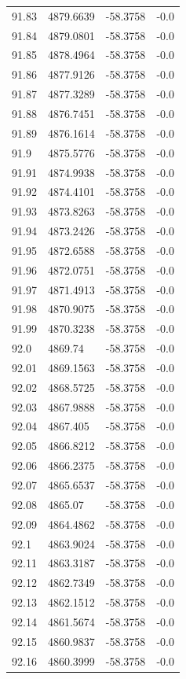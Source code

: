 \begin{table}[H]
\begin{tabular}{llll}
91.83 & 4879.6639 & -58.3758 & -0.0 \\
91.84 & 4879.0801 & -58.3758 & -0.0 \\
91.85 & 4878.4964 & -58.3758 & -0.0 \\
91.86 & 4877.9126 & -58.3758 & -0.0 \\
91.87 & 4877.3289 & -58.3758 & -0.0 \\
91.88 & 4876.7451 & -58.3758 & -0.0 \\
91.89 & 4876.1614 & -58.3758 & -0.0 \\
91.9 & 4875.5776 & -58.3758 & -0.0 \\
91.91 & 4874.9938 & -58.3758 & -0.0 \\
91.92 & 4874.4101 & -58.3758 & -0.0 \\
91.93 & 4873.8263 & -58.3758 & -0.0 \\
91.94 & 4873.2426 & -58.3758 & -0.0 \\
91.95 & 4872.6588 & -58.3758 & -0.0 \\
91.96 & 4872.0751 & -58.3758 & -0.0 \\
91.97 & 4871.4913 & -58.3758 & -0.0 \\
91.98 & 4870.9075 & -58.3758 & -0.0 \\
91.99 & 4870.3238 & -58.3758 & -0.0 \\
92.0 & 4869.74 & -58.3758 & -0.0 \\
92.01 & 4869.1563 & -58.3758 & -0.0 \\
92.02 & 4868.5725 & -58.3758 & -0.0 \\
92.03 & 4867.9888 & -58.3758 & -0.0 \\
92.04 & 4867.405 & -58.3758 & -0.0 \\
92.05 & 4866.8212 & -58.3758 & -0.0 \\
92.06 & 4866.2375 & -58.3758 & -0.0 \\
92.07 & 4865.6537 & -58.3758 & -0.0 \\
92.08 & 4865.07 & -58.3758 & -0.0 \\
92.09 & 4864.4862 & -58.3758 & -0.0 \\
92.1 & 4863.9024 & -58.3758 & -0.0 \\
92.11 & 4863.3187 & -58.3758 & -0.0 \\
92.12 & 4862.7349 & -58.3758 & -0.0 \\
92.13 & 4862.1512 & -58.3758 & -0.0 \\
92.14 & 4861.5674 & -58.3758 & -0.0 \\
92.15 & 4860.9837 & -58.3758 & -0.0 \\
92.16 & 4860.3999 & -58.3758 & -0.0 \\

\end{tabular}
\end{table}
